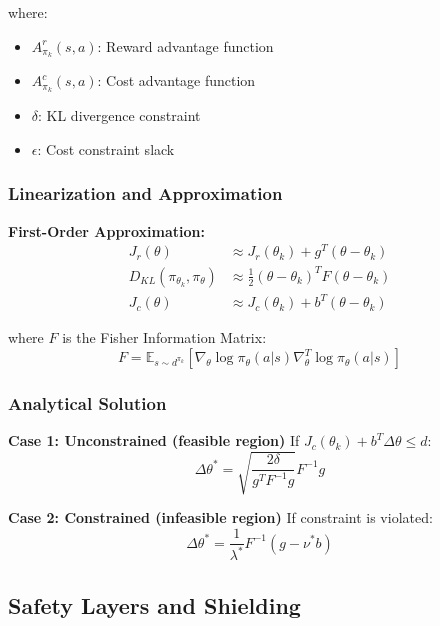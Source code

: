 \documentclass[12pt]{article}
\begin{document}
{{{{where:
\begin{itemize}
\item $A^r_{\pi_k}(s,a)$: Reward advantage function
\item $A^c_{\pi_k}(s,a)$: Cost advantage function
\item $\delta$: KL divergence constraint
\item $\epsilon$: Cost constraint slack
\end{itemize}

\subsubsection{Linearization and Approximation}

\textbf{First-Order Approximation:}
\begin{align}
J_r(\theta) &\approx J_r(\theta_k) + g^T(\theta - \theta_k) \\
D_{KL}(\pi_{\theta_k}, \pi_\theta) &\approx \frac{1}{2}(\theta - \theta_k)^T F (\theta - \theta_k) \\
J_c(\theta) &\approx J_c(\theta_k) + b^T(\theta - \theta_k)
\end{align}

where $F$ is the Fisher Information Matrix:
\begin{equation}
F = \mathbb{E}_{s \sim d^{\pi_k}}\left[\nabla_{\theta} \log \pi_{\theta}(a|s) \nabla_{\theta}^T \log \pi_{\theta}(a|s)\right]
\end{equation}

\subsubsection{Analytical Solution}

\textbf{Case 1: Unconstrained (feasible region)}
If $J_c(\theta_k) + b^T \Delta\theta \leq d$:
\begin{equation}
\Delta\theta^* = \sqrt{\frac{2\delta}{g^T F^{-1} g}} F^{-1} g
\end{equation}

\textbf{Case 2: Constrained (infeasible region)}
If constraint is violated:
\begin{equation}
\Delta\theta^* = \frac{1}{\lambda^*}F^{-1}(g - \nu^* b)
\end{equation}

\subsection{Safety Layers and Shielding}

}}}}
\end{document}
